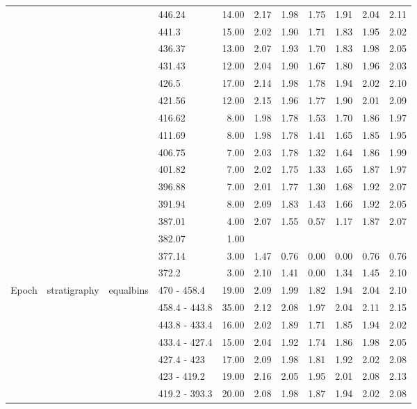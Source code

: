 \begin{longtable}{llllrrrrrrr}
   &  &  & 446.24 & 14.00 & 2.17 & 1.98 & 1.75 & 1.91 & 2.04 & 2.11 \\ 
   &  &  & 441.3 & 15.00 & 2.02 & 1.90 & 1.71 & 1.83 & 1.95 & 2.02 \\ 
   &  &  & 436.37 & 13.00 & 2.07 & 1.93 & 1.70 & 1.83 & 1.98 & 2.05 \\ 
   &  &  & 431.43 & 12.00 & 2.04 & 1.90 & 1.67 & 1.80 & 1.96 & 2.03 \\ 
   &  &  & 426.5 & 17.00 & 2.14 & 1.98 & 1.78 & 1.94 & 2.02 & 2.10 \\ 
   &  &  & 421.56 & 12.00 & 2.15 & 1.96 & 1.77 & 1.90 & 2.01 & 2.09 \\ 
   &  &  & 416.62 & 8.00 & 1.98 & 1.78 & 1.53 & 1.70 & 1.86 & 1.97 \\ 
   &  &  & 411.69 & 8.00 & 1.98 & 1.78 & 1.41 & 1.65 & 1.85 & 1.95 \\ 
   &  &  & 406.75 & 7.00 & 2.03 & 1.78 & 1.32 & 1.64 & 1.86 & 1.99 \\ 
   &  &  & 401.82 & 7.00 & 2.02 & 1.75 & 1.33 & 1.65 & 1.87 & 1.97 \\ 
   &  &  & 396.88 & 7.00 & 2.01 & 1.77 & 1.30 & 1.68 & 1.92 & 2.07 \\ 
   &  &  & 391.94 & 8.00 & 2.09 & 1.83 & 1.43 & 1.66 & 1.92 & 2.05 \\ 
   &  &  & 387.01 & 4.00 & 2.07 & 1.55 & 0.57 & 1.17 & 1.87 & 2.07 \\ 
   &  &  & 382.07 & 1.00 &  &  &  &  &  &  \\ 
   &  &  & 377.14 & 3.00 & 1.47 & 0.76 & 0.00 & 0.00 & 0.76 & 0.76 \\ 
   &  &  & 372.2 & 3.00 & 2.10 & 1.41 & 0.00 & 1.34 & 1.45 & 2.10 \\ 
  Epoch & stratigraphy & equalbins & 470 - 458.4 & 19.00 & 2.09 & 1.99 & 1.82 & 1.94 & 2.04 & 2.10 \\ 
   &  &  & 458.4 - 443.8 & 35.00 & 2.12 & 2.08 & 1.97 & 2.04 & 2.11 & 2.15 \\ 
   &  &  & 443.8 - 433.4 & 16.00 & 2.02 & 1.89 & 1.71 & 1.85 & 1.94 & 2.02 \\ 
   &  &  & 433.4 - 427.4 & 15.00 & 2.04 & 1.92 & 1.74 & 1.86 & 1.98 & 2.05 \\ 
   &  &  & 427.4 - 423 & 17.00 & 2.09 & 1.98 & 1.81 & 1.92 & 2.02 & 2.08 \\ 
   &  &  & 423 - 419.2 & 19.00 & 2.16 & 2.05 & 1.95 & 2.01 & 2.08 & 2.13 \\ 
   &  &  & 419.2 - 393.3 & 20.00 & 2.08 & 1.98 & 1.87 & 1.94 & 2.02 & 2.08 \\ 

\end{longtable}
